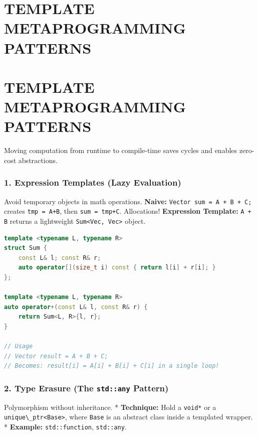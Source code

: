\hypertarget{template-metaprogramming-patterns}{%
\chapter{TEMPLATE METAPROGRAMMING
PATTERNS}\label{template-metaprogramming-patterns}}

\hypertarget{template-metaprogramming-patterns-1}{%
\chapter{TEMPLATE METAPROGRAMMING
PATTERNS}\label{template-metaprogramming-patterns-1}}

Moving computation from runtime to compile-time saves cycles and enables
zero-cost abstractions.

\hypertarget{expression-templates-lazy-evaluation}{%
\subsection{1. Expression Templates (Lazy
Evaluation)}\label{expression-templates-lazy-evaluation}}

Avoid temporary objects in math operations. \textbf{Naive:}
\passthrough{\lstinline!Vector sum = A + B + C;!} creates
\passthrough{\lstinline!tmp = A+B!}, then
\passthrough{\lstinline!sum = tmp+C!}. Allocations! \textbf{Expression
Template:} \passthrough{\lstinline!A + B!} returns a lightweight
\passthrough{\lstinline!Sum<Vec, Vec>!} object.

\begin{lstlisting}[language={C++}]
template <typename L, typename R>
struct Sum {
    const L& l; const R& r;
    auto operator[](size_t i) const { return l[i] + r[i]; }
};

template <typename L, typename R>
auto operator+(const L& l, const R& r) {
    return Sum<L, R>{l, r};
}

// Usage
// Vector result = A + B + C; 
// Becomes: result[i] = A[i] + B[i] + C[i] in a single loop!
\end{lstlisting}

\hypertarget{type-erasure-the-stdany-pattern}{%
\subsection{\texorpdfstring{2. Type Erasure (The \texttt{std::any}
Pattern)}{2. Type Erasure (The std::any Pattern)}}\label{type-erasure-the-stdany-pattern}}

Polymorphism without inheritance. * \textbf{Technique:} Hold a
\passthrough{\lstinline!void*!} or a
\passthrough{\lstinline!unique\_ptr<Base>!}, where
\passthrough{\lstinline!Base!} is an abstract class inside a templated
wrapper. * \textbf{Example:} \passthrough{\lstinline!std::function!},
\passthrough{\lstinline!std::any!}.

